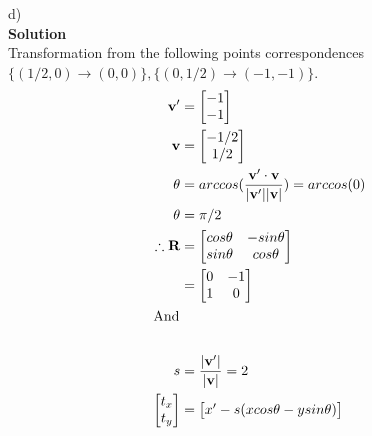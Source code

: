 \documentclass[letterpaper, 11pt]{article}
\begin{document}
d)\\
\textbf{Solution}\\
Transformation from the following points correspondences $\{(1/2,0)\rightarrow(0,0)\},
    \{(0,1/2)\rightarrow(-1,-1)\}$.
\begin{align*}
    \textbf{v}'           & =
    \begin{bmatrix}
        -1 \\
        -1
    \end{bmatrix}                                                                                           \\
    \textbf{v}            & =
    \begin{bmatrix}
        -1/2 \\
        1/2
    \end{bmatrix}                                                                                           \\
    \theta                & = arccos(\frac{\textbf{v}'\cdot\textbf{v}}{|\textbf{v}'||\textbf{v}|})=arccos(0) \\
    \theta                & =\pi/2                                                                           \\
    \therefore \textbf{R} & =
    \begin{bmatrix}
        cos\theta & -sin\theta \\
        sin\theta & cos\theta
    \end{bmatrix}                                                                                   \\
                          & =
    \begin{bmatrix}
        0 & -1 \\
        1 & 0
    \end{bmatrix}                                                                                           \\
    \intertext{And}                                                                                          \\
    s                     & = \frac{|\textbf{v}'|}{|\textbf{v}|} = 2                                         \\
    \begin{bmatrix}
        t_x \\
        t_y
    \end{bmatrix}
                          & =
    \begin{bmatrix}
        x' - s(x cos\theta - y sin\theta) \\

\end{bmatrix}
\end{align*}
\end{document}
